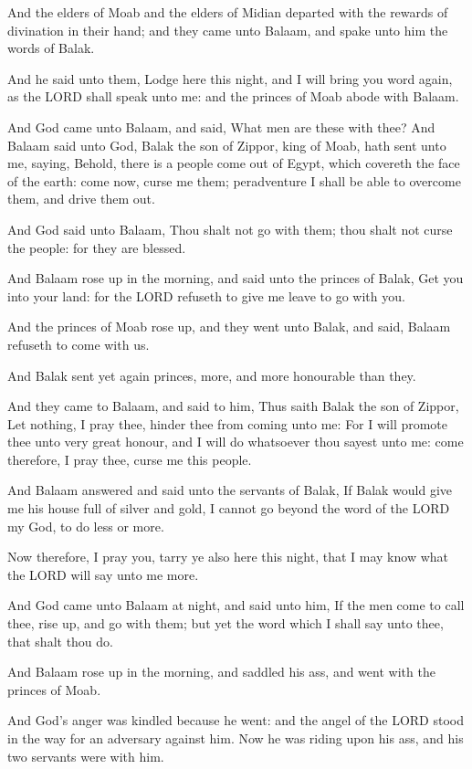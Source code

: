 \Verse And the elders of Moab and the elders of Midian departed with the
rewards of divination in their hand; and they came unto Balaam, and
spake unto him the words of Balak.

\Verse And he said unto them, Lodge here this night, and I will bring
you word again, as the LORD shall speak unto me: and the princes of
Moab abode with Balaam.

\Verse And God came unto Balaam, and said, What men are these with thee?
\Verse And Balaam said unto God, Balak the son of Zippor, king of Moab,
hath sent unto me, saying, \Verse Behold, there is a people come out of
Egypt, which covereth the face of the earth: come now, curse me them;
peradventure I shall be able to overcome them, and drive them out.

\Verse And God said unto Balaam, Thou shalt not go with them; thou
shalt not curse the people: for they are blessed.

\Verse And Balaam rose up in the morning, and said unto the princes of
Balak, Get you into your land: for the LORD refuseth to give me leave
to go with you.

\Verse And the princes of Moab rose up, and they went unto Balak, and
said, Balaam refuseth to come with us.

\Verse And Balak sent yet again princes, more, and more honourable than
they.

\Verse And they came to Balaam, and said to him, Thus saith Balak the
son of Zippor, Let nothing, I pray thee, hinder thee from coming unto
me: \Verse For I will promote thee unto very great honour, and I will
do whatsoever thou sayest unto me: come therefore, I pray thee, curse
me this people.

\Verse And Balaam answered and said unto the servants of Balak, If
Balak would give me his house full of silver and gold, I cannot go
beyond the word of the LORD my God, to do less or more.

\Verse Now therefore, I pray you, tarry ye also here this night, that I
may know what the LORD will say unto me more.

\Verse And God came unto Balaam at night, and said unto him, If the men
come to call thee, rise up, and go with them; but yet the word which I
shall say unto thee, that shalt thou do.

\Verse And Balaam rose up in the morning, and saddled his ass, and went
with the princes of Moab.

\Verse And God's anger was kindled because he went: and the angel of
the LORD stood in the way for an adversary against him. Now he was
riding upon his ass, and his two servants were with him.

